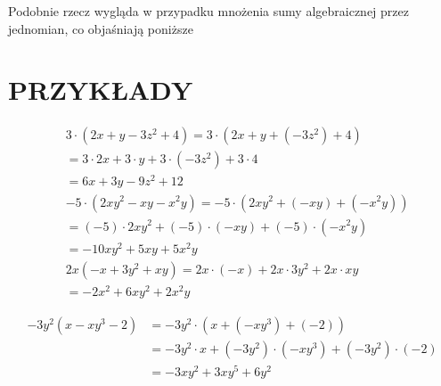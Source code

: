 \documentclass[10pt]{article}
\begin{document}
Podobnie rzecz wygląda w przypadku mnożenia sumy algebraicznej przez jednomian, co objaśniają poniższe

\section*{PRZYKŁADY}
\[
\begin{aligned}
& 3 \cdot\left(2 x+y-3 z^{2}+4\right)=3 \cdot\left(2 x+y+\left(-3 z^{2}\right)+4\right) \\
&=3 \cdot 2 x+3 \cdot y+3 \cdot\left(-3 z^{2}\right)+3 \cdot 4 \\
&=6 x+3 y-9 z^{2}+12 \\
&-5 \cdot\left(2 x y^{2}-x y-x^{2} y\right)=-5 \cdot\left(2 x y^{2}+(-x y)+\left(-x^{2} y\right)\right) \\
&=(-5) \cdot 2 x y^{2}+(-5) \cdot(-x y)+(-5) \cdot\left(-x^{2} y\right) \\
&=-10 x y^{2}+5 x y+5 x^{2} y \\
& 2 x\left(-x+3 y^{2}+x y\right)=2 x \cdot(-x)+2 x \cdot 3 y^{2}+2 x \cdot x y \\
&=-2 x^{2}+6 x y^{2}+2 x^{2} y
\end{aligned}
\]

\[
\begin{aligned}
-3 y^{2}\left(x-x y^{3}-2\right) & =-3 y^{2} \cdot\left(x+\left(-x y^{3}\right)+(-2)\right) \\
& =-3 y^{2} \cdot x+\left(-3 y^{2}\right) \cdot\left(-x y^{3}\right)+\left(-3 y^{2}\right) \cdot(-2) \\
& =-3 x y^{2}+3 x y^{5}+6 y^{2}
\end{aligned}
\]
\end{document}
